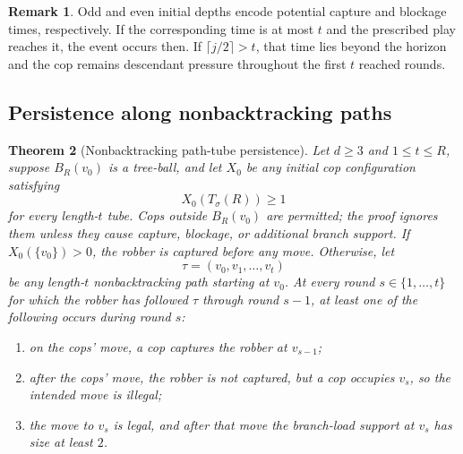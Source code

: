 \documentclass[11pt]{amsart}
\newtheorem{theorem}{Theorem}[section]
\theoremstyle{definition}
\newtheorem{remark}[theorem]{Remark}
\begin{document}
\begin{remark}
Odd and even initial depths encode potential capture and blockage times, respectively. If the corresponding time is at most $t$ and the prescribed play reaches it, the event occurs then. If $\lceil j/2\rceil>t$, that time lies beyond the horizon and the cop remains descendant pressure throughout the first $t$ reached rounds.
\end{remark}

\subsection{Persistence along nonbacktracking paths}

\begin{theorem}[Nonbacktracking path-tube persistence]
\label{thm:persistence}
Let $d\geq3$ and $1\leq t\leq R$, suppose $B_R(v_0)$ is a tree-ball, and let $X_0$ be any initial cop configuration satisfying
\[
X_0(T_\sigma(R))\geq1
\]
for every length-$t$ tube. Cops outside $B_R(v_0)$ are permitted; the proof ignores them unless they cause capture, blockage, or additional branch support. If $X_0(\{v_0\})>0$, the robber is captured before any move. Otherwise, let
\[
\tau=(v_0,v_1,\ldots,v_t)
\]
be any length-$t$ nonbacktracking path starting at $v_0$. At every round $s\in\{1,\ldots,t\}$ for which the robber has followed $\tau$ through round $s-1$, at least one of the following occurs during round $s$:
\begin{enumerate}[label=(\alph*)]
\item on the cops' move, a cop captures the robber at $v_{s-1}$;
\item after the cops' move, the robber is not captured, but a cop occupies $v_s$, so the intended move is illegal;
\item the move to $v_s$ is legal, and after that move the branch-load support at $v_s$ has size at least $2$.
\end{enumerate}
\end{theorem}
\end{document}
